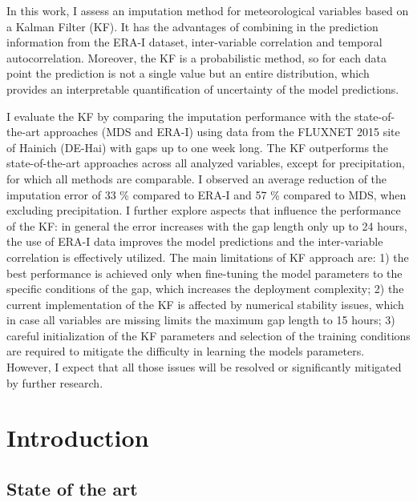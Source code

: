\documentclass{article}
\let\Oldsection\section
\renewcommand{\section}{\FloatBarrier\Oldsection}
\let\Oldsubsection\subsection
\renewcommand{\subsection}{\FloatBarrier\Oldsubsection}
\begin{document}
In this work, I assess an imputation method for meteorological variables based on a Kalman Filter (KF).
It has the advantages of combining in the prediction information from the ERA-I dataset, inter-variable correlation and  temporal autocorrelation. Moreover, the KF is a probabilistic method, so for each data point the prediction is not a single value but an entire distribution, which provides an interpretable quantification of uncertainty of the model predictions.

I evaluate the KF by  comparing the imputation performance with the state-of-the-art approaches (MDS and ERA-I) using data from the FLUXNET 2015 site of Hainich (DE-Hai) with gaps up to one week long. The KF outperforms the state-of-the-art approaches across all analyzed variables, except for precipitation, for which all methods are comparable. I observed an average reduction of the imputation error of 33 \% compared to ERA-I and  57 \% compared to MDS, when excluding precipitation. I further explore aspects that influence the performance of the KF: in general the error increases with the gap length only up to 24 hours, the use of ERA-I data improves the model predictions and the inter-variable correlation is effectively utilized.
The main limitations of KF approach are: 1) the best performance is achieved only when fine-tuning the model parameters to the specific conditions of the gap, which increases the deployment complexity; 2) the current implementation of the KF is affected by numerical stability issues, which in case all variables are missing limits the maximum gap length to 15 hours; 3) careful initialization of the KF parameters and selection of the training conditions are required to mitigate the difficulty in learning the models parameters. However, I expect that all those issues will be resolved or significantly mitigated by further research.
\thispagestyle{empty}
\clearpage


\tableofcontents
\thispagestyle{empty}
\clearpage

\section{Introduction}

\subsection{State of the art}
\end{document}
